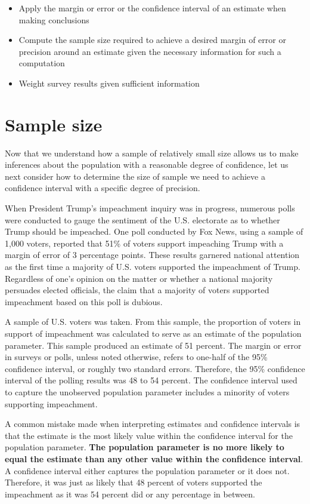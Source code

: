 \documentclass[
]{book}
\providecommand{\tightlist}{%
  \setlength{\itemsep}{0pt}\setlength{\parskip}{0pt}}
\begin{document}
\begin{itemize}
\tightlist
\item
  Apply the margin or error or the confidence interval of an estimate when making conclusions
\item
  Compute the sample size required to achieve a desired margin of error or precision around an estimate given the necessary information for such a computation
\item
  Weight survey results given sufficient information
\end{itemize}

\hypertarget{sample-size}{%
\section{Sample size}\label{sample-size}}

Now that we understand how a sample of relatively small size allows us to make inferences about the population with a reasonable degree of confidence, let us next consider how to determine the size of sample we need to achieve a confidence interval with a specific degree of precision.

When President Trump's impeachment inquiry was in progress, numerous polls were conducted to gauge the sentiment of the U.S. electorate as to whether Trump should be impeached. One poll conducted by Fox News, using a sample of 1,000 voters, reported that 51\% of voters support impeaching Trump with a margin of error of 3 percentage points. These results garnered national attention as the first time a majority of U.S. voters supported the impeachment of Trump. Regardless of one's opinion on the matter or whether a national majority persuades elected officials, the claim that a majority of voters supported impeachment based on this poll is dubious.

A sample of U.S. voters was taken. From this sample, the proportion of voters in support of impeachment was calculated to serve as an estimate of the population parameter. This sample produced an estimate of 51 percent. The margin or error in surveys or polls, unless noted otherwise, refers to one-half of the 95\% confidence interval, or roughly two standard errors. Therefore, the 95\% confidence interval of the polling results was 48 to 54 percent. The confidence interval used to capture the unobserved population parameter includes a minority of voters supporting impeachment.

A common mistake made when interpreting estimates and confidence intervals is that the estimate is the most likely value within the confidence interval for the population parameter. \textbf{The population parameter is no more likely to equal the estimate than any other value within the confidence interval}. A confidence interval either captures the population parameter or it does not. Therefore, it was just as likely that 48 percent of voters supported the impeachment as it was 54 percent did or any percentage in between.
\end{document}
